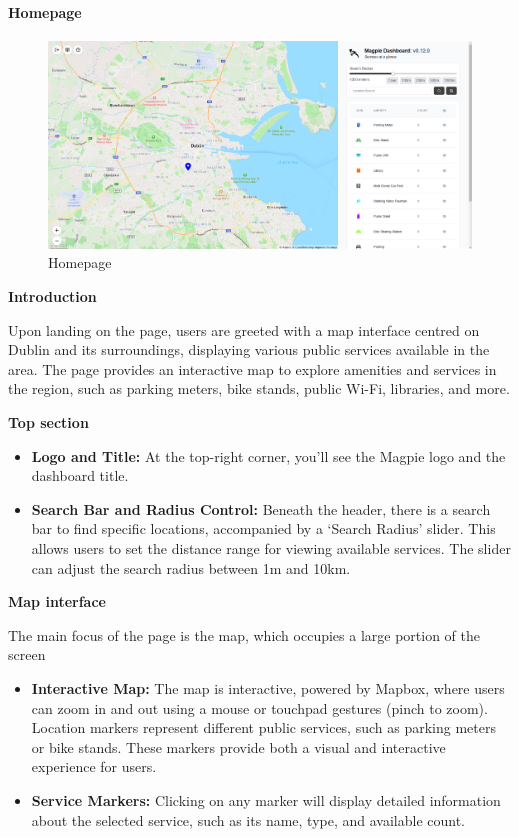 \newpage{}

\paragraph{Homepage}\mbox{}

\begin{figure}[htbp]
    \centering{}
    \includegraphics[width=1\textwidth]{images/site/home/homepage_1.png}
    \caption{Homepage}
\end{figure}

\textbf{Introduction}

Upon landing on the page, users are greeted with a map interface centred on
Dublin and its surroundings, displaying various public services available in the
area. The page provides an interactive map to explore amenities and services in
the region, such as parking meters, bike stands, public Wi{-}Fi, libraries, and
more.

\textbf{Top section}

\begin{itemize}
    \item{} \textbf{Logo and Title:} At the top{-}right corner, you'll see the
    Magpie logo and the dashboard title.
    \item{} \textbf{Search Bar and Radius Control:} Beneath the header, there is
    a search bar to find specific locations, accompanied by a `Search Radius'
    slider. This allows users to set the distance range for viewing available
    services. The slider can adjust the search radius between 1m and 10km.
\end{itemize}

\textbf{Map interface}

The main focus of the page is the map, which occupies a large portion of the
screen

\begin{itemize}
    \item{} \textbf{Interactive Map:} The map is interactive, powered by Mapbox,
    where users can zoom in and out using a mouse or touchpad gestures (pinch to
    zoom). Location markers represent different public services, such as parking
    meters or bike stands. These markers provide both a visual and interactive
    experience for users.
    \item{} \textbf{Service Markers:} Clicking on any marker will display
    detailed information about the selected service, such as its name, type, and
    available count.
\end{itemize}

